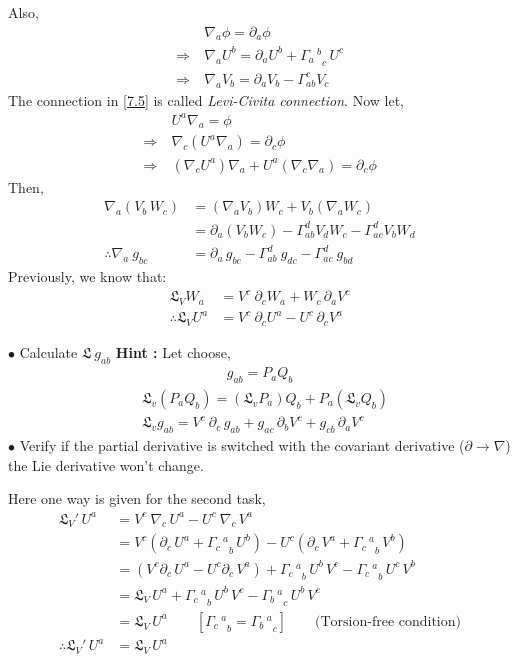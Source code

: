 \documentclass[14pt]{article} %
\begin{document}
Also,
\begin{align*}
& \nabla_a \phi = \partial_a \phi \\
\Rightarrow~ &\nabla_a U^b = \partial_a U^b + {\Gamma_a\,^b}_{c}\, U^c \tag{7.5} \label{7.5} \\
\Rightarrow~ & \nabla_a V_b = \partial_a V_b - \Gamma_{ab}^c V_c
\end{align*}
The connection in \eqref{7.5} is called \textit{Levi-Civita connection}. Now let,
\begin{align*}
& U^a \nabla_a = \phi \\
\Rightarrow~ & \nabla_c (U^a \nabla_a) = \partial_c \phi \\
\Rightarrow~ & (\nabla_c U^a)\nabla_a + U^a (\nabla_c \nabla_a) = \partial_c \phi
\end{align*}
Then,
\begin{align*}
\nabla_a (V_b\,W_c) &= (\nabla_a V_b) W_c + V_b (\nabla_a W_c) \\
&= \partial_a (V_b W_c) - \Gamma^d_{ab} V_d W_c - \Gamma^d_{ac} V_b W_d \\
\therefore \nabla_a~g_{bc} &= \partial_a\,g_{bc} - \Gamma^d_{ab}~g_{dc} - \Gamma^d_{ac}~g_{bd} 
\end{align*}
Previously, we know that:
\begin{align*}
\mathfrak{L}_V W_a &= V^c~\partial_c W_a + W_c\, \partial_a V^c \\
\therefore \mathfrak{L}_V U^a &= V^c~ \partial_c U^a - U^c\, \partial_c V^a
\end{align*}
\begin{tcolorbox}[ title=HW]
$\bullet$ Calculate $\mathfrak{L}~g_{ab}$
\textbf{Hint :} Let choose, 
\begin{align*} g_{ab} = P_a Q_b \end{align*}
\begin{align*}
& \mathfrak{L}_v (P_a Q_b) = (\mathfrak{L}_vP_a) Q_b + P_a (\mathfrak{L}_v Q_b) \\
& \mathfrak{L}_v g_{ab} = V^c~ \partial_c\, g_{ab} + g_{ac}\, \partial_b V^c + g_{cb}\, \partial_a V^c
\end{align*}
$\bullet$ Verify if the partial derivative is switched with the covariant derivative ($\partial \rightarrow\nabla$) the Lie derivative won't change.
\end{tcolorbox}
Here one way is given for the second task,
\begin{align*}
\mathfrak{L}_V'\,U^a &= V^c~ \nabla_c \, U^a - U^c~ \nabla_c \,V^a \\
&= V^c (\partial_c\, U^a + {\Gamma_c\,^a}_b\,U^b) - U^c (\partial_c\, V^a + {\Gamma_c\,^a}_b\,V^b) \\
&= (V^c \partial_c\, U^a - U^c \partial_c\, V^a ) + {\Gamma_c\,^a}_b\,U^b \, V^c - {\Gamma_c\,^a}_b\,U^c \, V^b \\
&= \mathfrak{L}_V\, U^a + {\Gamma_c\,^a}_b\,U^b \, V^c - {\Gamma_b\,^a}_c\,U^b \, V^c \\
&= \mathfrak{L}_V\, U^a \quad \quad [ {\Gamma_c\,^a}_b = {\Gamma_b\,^a}_c ] \quad \quad \text{(Torsion-free condition)}\\
\therefore \mathfrak{L}_V '\, U^a &= \mathfrak{L}_V\, U^a
\end{align*}
\end{document}
